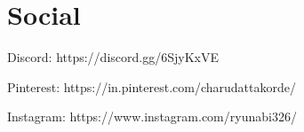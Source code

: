 \documentclass[fontsize=11pt]{tccv}
\begin{document}
\section{Social}
\begin{skills}
\item{Discord: https://discord.gg/6SjyKxVE}\\
\item {Pinterest: https://in.pinterest.com/charudattakorde/}\\
\item {Instagram: https://www.instagram.com/ryunabi326/}\\
\end{skills}
\vspace{1em}

\end{document}
